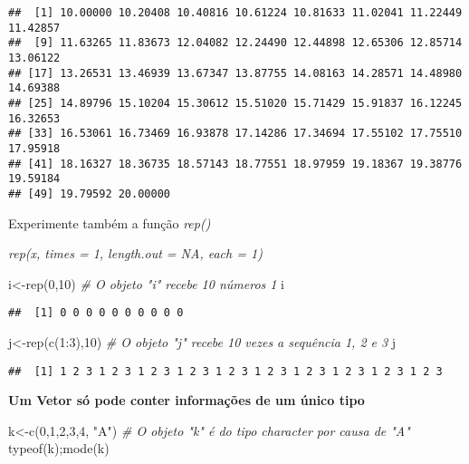 \documentclass[
]{book}
\newenvironment{Shaded}{\begin{snugshade}}{\end{snugshade}}
\newcommand{\CommentTok}[1]{\textcolor[rgb]{0.56,0.35,0.01}{\textit{#1}}}
\newcommand{\DecValTok}[1]{\textcolor[rgb]{0.00,0.00,0.81}{#1}}
\newcommand{\FunctionTok}[1]{\textcolor[rgb]{0.00,0.00,0.00}{#1}}
\newcommand{\NormalTok}[1]{#1}
\newcommand{\OtherTok}[1]{\textcolor[rgb]{0.56,0.35,0.01}{#1}}
\newcommand{\SpecialCharTok}[1]{\textcolor[rgb]{0.00,0.00,0.00}{#1}}
\newcommand{\StringTok}[1]{\textcolor[rgb]{0.31,0.60,0.02}{#1}}
\begin{document}
\begin{verbatim}
##  [1] 10.00000 10.20408 10.40816 10.61224 10.81633 11.02041 11.22449 11.42857
##  [9] 11.63265 11.83673 12.04082 12.24490 12.44898 12.65306 12.85714 13.06122
## [17] 13.26531 13.46939 13.67347 13.87755 14.08163 14.28571 14.48980 14.69388
## [25] 14.89796 15.10204 15.30612 15.51020 15.71429 15.91837 16.12245 16.32653
## [33] 16.53061 16.73469 16.93878 17.14286 17.34694 17.55102 17.75510 17.95918
## [41] 18.16327 18.36735 18.57143 18.77551 18.97959 19.18367 19.38776 19.59184
## [49] 19.79592 20.00000
\end{verbatim}

Experimente também a função \emph{rep()}

\emph{\emph{rep(x, times = 1, length.out = NA, each = 1)}}

\begin{Shaded}
\begin{Highlighting}[]
\NormalTok{i}\OtherTok{\textless{}{-}}\FunctionTok{rep}\NormalTok{(}\DecValTok{0}\NormalTok{,}\DecValTok{10}\NormalTok{) }\CommentTok{\# O objeto "i" recebe 10 números 1}
\NormalTok{i}
\end{Highlighting}
\end{Shaded}

\begin{verbatim}
##  [1] 0 0 0 0 0 0 0 0 0 0
\end{verbatim}

\begin{Shaded}
\begin{Highlighting}[]
\NormalTok{j}\OtherTok{\textless{}{-}}\FunctionTok{rep}\NormalTok{(}\FunctionTok{c}\NormalTok{(}\DecValTok{1}\SpecialCharTok{:}\DecValTok{3}\NormalTok{),}\DecValTok{10}\NormalTok{) }\CommentTok{\# O objeto "j" recebe 10 vezes a sequência 1, 2 e 3}
\NormalTok{j}
\end{Highlighting}
\end{Shaded}

\begin{verbatim}
##  [1] 1 2 3 1 2 3 1 2 3 1 2 3 1 2 3 1 2 3 1 2 3 1 2 3 1 2 3 1 2 3
\end{verbatim}

\textbf{Um Vetor só pode conter informações de um único tipo}

\begin{Shaded}
\begin{Highlighting}[]
\NormalTok{k}\OtherTok{\textless{}{-}}\FunctionTok{c}\NormalTok{(}\DecValTok{0}\NormalTok{,}\DecValTok{1}\NormalTok{,}\DecValTok{2}\NormalTok{,}\DecValTok{3}\NormalTok{,}\DecValTok{4}\NormalTok{, }\StringTok{"A"}\NormalTok{) }\CommentTok{\# O objeto "k" é do tipo character por causa de "A"}
\FunctionTok{typeof}\NormalTok{(k);}\FunctionTok{mode}\NormalTok{(k)}
\end{Highlighting}
\end{Shaded}
\end{document}
